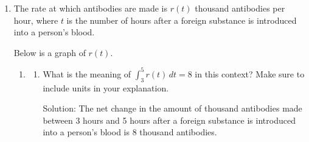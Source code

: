 \documentclass[11pt]{article}
\begin{document}
\begin{enumerate}

\newpage


\item The rate at which antibodies are made is $r(t)$ thousand antibodies per hour, where $t$ is the number of hours after a foreign substance is introduced into a person's blood.

Below is a graph of $r(t)$.

\begin{center}
    \end{center}

\begin{enumerate}

    \item \begin{enumerate}
    \item What is the meaning of $\displaystyle\int_{3}^5r(t)\, dt=8$ in this context? Make sure to include units in your explanation.

    {\color{blue}Solution: The net change in the amount of thousand antibodies made between 3 hours and 5 hours after a foreign substance is introduced into a person's blood is 8 thousand antibodies.
    
}
\end{enumerate}
\end{enumerate}
\end{enumerate}
\end{document}

